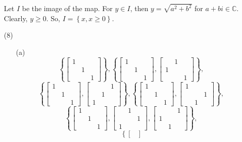 \begin{itemize}
Let $I$ be the image of the map. For $y \in I$, then $y = \sqrt{a^2 + b^2}$ for $a + bi \in \mathbb{C}$. Clearly, $y \geq 0$. So, $I = \left\lbrace x, x \geq 0 \right\rbrace$.
\item[(8)]
\begin{itemize}
\item[(a)]
$$\left\lbrace \begin{bmatrix}
1 \\
& 1 \\
& & 1
\end{bmatrix} \right\rbrace, \left\lbrace \begin{bmatrix}
1 \\
& 1 \\
& & 1
\end{bmatrix}, \begin{bmatrix}
& 1 \\
1 \\
& & 1
\end{bmatrix} \right\rbrace,$$
$$\left\lbrace \begin{bmatrix}
1 \\
& 1 \\
& & 1
\end{bmatrix}, \begin{bmatrix}
& & 1 \\
& 1 \\
1
\end{bmatrix} \right\rbrace, \left\lbrace \begin{bmatrix}
1 \\
& 1 \\
& & 1
\end{bmatrix}, \begin{bmatrix}
1 \\
& & 1 \\
& 1
\end{bmatrix} \right\rbrace,$$
$$\left\lbrace \begin{bmatrix}
1 \\
& 1 \\
& & 1
\end{bmatrix}, \begin{bmatrix}
& 1 \\
& & 1 \\
1
\end{bmatrix}, \begin{bmatrix}
& & 1 \\
1 \\
& 1
\end{bmatrix} \right\rbrace,$$
$$\left\lbrace \begin{bmatrix}

\end{bmatrix}$$
\end{itemize}
\end{itemize}
